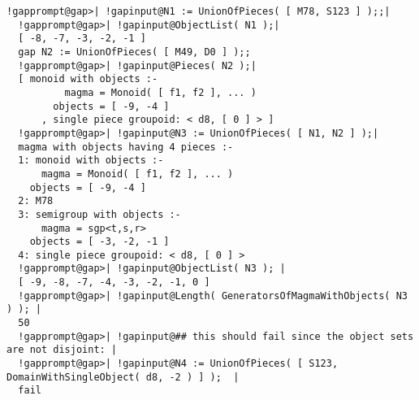 \documentclass[a4paper,11pt]{report}
\begin{document}
{{\begin{Verbatim}[commandchars=!@|,fontsize=\small,frame=single,label=Example]
  !gapprompt@gap>| !gapinput@N1 := UnionOfPieces( [ M78, S123 ] );;|
  !gapprompt@gap>| !gapinput@ObjectList( N1 );|
  [ -8, -7, -3, -2, -1 ]
  gap N2 := UnionOfPieces( [ M49, D0 ] );;
  !gapprompt@gap>| !gapinput@Pieces( N2 );|
  [ monoid with objects :-
          magma = Monoid( [ f1, f2 ], ... )
        objects = [ -9, -4 ]
      , single piece groupoid: < d8, [ 0 ] > ]
  !gapprompt@gap>| !gapinput@N3 := UnionOfPieces( [ N1, N2 ] );|
  magma with objects having 4 pieces :-
  1: monoid with objects :-
      magma = Monoid( [ f1, f2 ], ... )
    objects = [ -9, -4 ]
  2: M78
  3: semigroup with objects :-
      magma = sgp<t,s,r>
    objects = [ -3, -2, -1 ]
  4: single piece groupoid: < d8, [ 0 ] >
  !gapprompt@gap>| !gapinput@ObjectList( N3 ); |
  [ -9, -8, -7, -4, -3, -2, -1, 0 ]
  !gapprompt@gap>| !gapinput@Length( GeneratorsOfMagmaWithObjects( N3 ) ); |
  50
  !gapprompt@gap>| !gapinput@## this should fail since the object sets are not disjoint: |
  !gapprompt@gap>| !gapinput@N4 := UnionOfPieces( [ S123, DomainWithSingleObject( d8, -2 ) ] );  |
  fail
  
\end{Verbatim}
 }

 }

            
\end{document}

